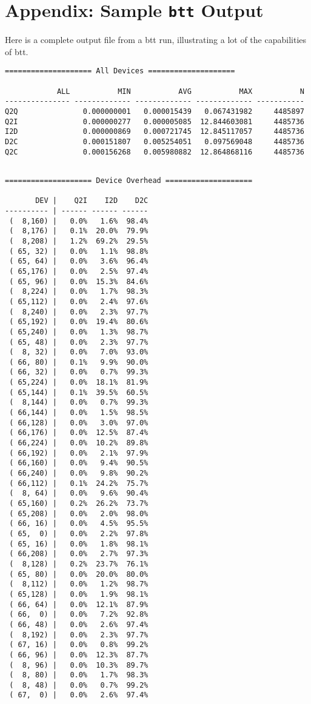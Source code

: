 \documentclass{article}
\begin{document}
\newpage\section{\label{sec:appendix}Appendix: Sample \texttt{btt}
Output}
  
  Here is a complete output file from a btt run, illustrating a lot of the
  capabilities of btt.

\begin{verbatim}
==================== All Devices ====================

            ALL           MIN           AVG           MAX           N
--------------- ------------- ------------- ------------- -----------
Q2Q               0.000000001   0.000015439   0.067431982     4485897
Q2I               0.000000277   0.000005085  12.844603081     4485736
I2D               0.000000869   0.000721745  12.845117057     4485736
D2C               0.000151807   0.005254051   0.097569048     4485736
Q2C               0.000156268   0.005980882  12.864868116     4485736

\end{verbatim}
\newpage\begin{verbatim}

==================== Device Overhead ====================

       DEV |    Q2I    I2D    D2C
---------- | ------ ------ ------
 (  8,160) |   0.0%   1.6%  98.4%
 (  8,176) |   0.1%  20.0%  79.9%
 (  8,208) |   1.2%  69.2%  29.5%
 ( 65, 32) |   0.0%   1.1%  98.8%
 ( 65, 64) |   0.0%   3.6%  96.4%
 ( 65,176) |   0.0%   2.5%  97.4%
 ( 65, 96) |   0.0%  15.3%  84.6%
 (  8,224) |   0.0%   1.7%  98.3%
 ( 65,112) |   0.0%   2.4%  97.6%
 (  8,240) |   0.0%   2.3%  97.7%
 ( 65,192) |   0.0%  19.4%  80.6%
 ( 65,240) |   0.0%   1.3%  98.7%
 ( 65, 48) |   0.0%   2.3%  97.7%
 (  8, 32) |   0.0%   7.0%  93.0%
 ( 66, 80) |   0.1%   9.9%  90.0%
 ( 66, 32) |   0.0%   0.7%  99.3%
 ( 65,224) |   0.0%  18.1%  81.9%
 ( 65,144) |   0.1%  39.5%  60.5%
 (  8,144) |   0.0%   0.7%  99.3%
 ( 66,144) |   0.0%   1.5%  98.5%
 ( 66,128) |   0.0%   3.0%  97.0%
 ( 66,176) |   0.0%  12.5%  87.4%
 ( 66,224) |   0.0%  10.2%  89.8%
 ( 66,192) |   0.0%   2.1%  97.9%
 ( 66,160) |   0.0%   9.4%  90.5%
 ( 66,240) |   0.0%   9.8%  90.2%
 ( 66,112) |   0.1%  24.2%  75.7%
 (  8, 64) |   0.0%   9.6%  90.4%
 ( 65,160) |   0.2%  26.2%  73.7%
 ( 65,208) |   0.0%   2.0%  98.0%
 ( 66, 16) |   0.0%   4.5%  95.5%
 ( 65,  0) |   0.0%   2.2%  97.8%
 ( 65, 16) |   0.0%   1.8%  98.1%
 ( 66,208) |   0.0%   2.7%  97.3%
 (  8,128) |   0.2%  23.7%  76.1%
 ( 65, 80) |   0.0%  20.0%  80.0%
 (  8,112) |   0.0%   1.2%  98.7%
 ( 65,128) |   0.0%   1.9%  98.1%
 ( 66, 64) |   0.0%  12.1%  87.9%
 ( 66,  0) |   0.0%   7.2%  92.8%
 ( 66, 48) |   0.0%   2.6%  97.4%
 (  8,192) |   0.0%   2.3%  97.7%
 ( 67, 16) |   0.0%   0.8%  99.2%
 ( 66, 96) |   0.0%  12.3%  87.7%
 (  8, 96) |   0.0%  10.3%  89.7%
 (  8, 80) |   0.0%   1.7%  98.3%
 (  8, 48) |   0.0%   0.7%  99.2%
 ( 67,  0) |   0.0%   2.6%  97.4%

\end{verbatim}
\end{document}
